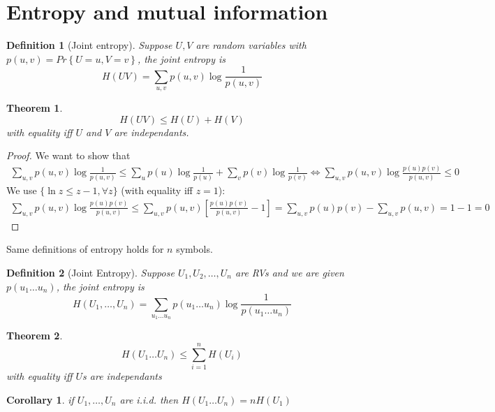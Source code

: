 \documentclass{article}
\newtheorem{theorem}{Theorem}[section]
\newtheorem{corollary}{Corollary}[theorem]
\newtheorem{definition}{Definition}[section]
\theoremstyle{definition} %
\renewcommand{\Pr}[1]{Pr\left\{#1\right\}}
\begin{document}
\newpage
\section{Entropy and mutual information}
\label{sec:entropy}

\begin{definition}[Joint entropy]
  Suppose $U, V$ are random variables with $p(u,v) = \Pr{U=u, V=v}$, the joint entropy is
  \[
    H(UV) = \sum_{u,v} p(u,v) \log \frac 1 {p(u,v)}
  \]
\end{definition}

\begin{theorem}
  \[
    H(UV) \leq H(U) + H(V)
  \]
  with equality iff $U$ and $V$ are independants.
\end{theorem}

\begin{proof}
  We want to show that
  \begin{align*}
    \sum_{u,v} p(u,v) \log \frac 1 {p(u,v)} \leq \sum_u p(u) \log \frac 1 {p(u)} + \sum_v p(v) \log \frac 1 {p(v)}
    \iff \sum_{u,v} p(u,v) \log \frac {p(u)p(v)} {p(u,v)} \leq 0
  \end{align*}
  We use $\{\ln z \leq z - 1, \forall z\}$ (with equality iff $z=1$):
  \begin{align*}
    \sum_{u,v} p(u,v) \log \frac {p(u)p(v)} {p(u,v)} \leq \sum_{u,v} p(u,v) \left[ \frac {p(u)p(v)} {p(u, v)} - 1 \right] = \sum_{u,v} p(u)p(v) - \sum_{u,v} p(u,v) = 1 - 1 = 0
  \end{align*}
\end{proof}

Same definitions of entropy holds for $n$ symbols.

\begin{definition}[Joint Entropy]
  Suppose $U_1, U_2, \dots, U_n$ are RVs and we are given $p(u_1 \dots u_n)$, the joint entropy is
  \[
    H(U_1, \dots, U_n) = \sum_{u_1 \dots u_n} p(u_1 \dots u_n) \log \frac 1 {p(u_1 \dots u_n)}
  \]
\end{definition}

\begin{theorem}
  \[
    H(U_1 \dots U_n) \leq \sum_{i=1}^n H(U_i)
  \]
  with equality iff $U$s are independants
\end{theorem}

\begin{corollary}
  if $U_1, \dots, U_n$ are i.i.d. then $H(U_1 \dots U_n) = nH(U_1)$
\end{corollary}
\end{document}
